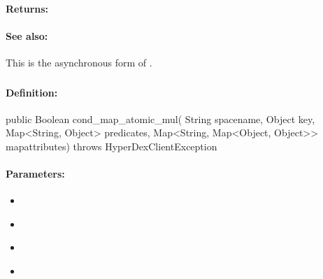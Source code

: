 \paragraph{Returns:}


\paragraph{See also:}  This is the asynchronous form of .

\pagebreak
\subsubsection{}
\label{api:java:cond_map_atomic_mul}


\paragraph{Definition:}
\begin{javacode}
public Boolean cond_map_atomic_mul(
        String spacename,
        Object key,
        Map<String, Object> predicates,
        Map<String, Map<Object, Object>> mapattributes) throws HyperDexClientException
\end{javacode}

\paragraph{Parameters:}
\begin{itemize}[noitemsep]
\item {}\\

\item {}\\

\item {}\\

\item {}\\

\end{itemize}

